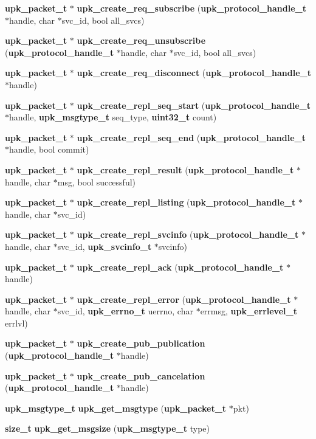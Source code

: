 \begin{DoxyCompactItemize}
{\bf upk\_\-packet\_\-t} $\ast$ {\bf upk\_\-create\_\-req\_\-subscribe} ({\bf upk\_\-protocol\_\-handle\_\-t} $\ast$handle, char $\ast$svc\_\-id, bool all\_\-svcs)
\item 
{\bf upk\_\-packet\_\-t} $\ast$ {\bf upk\_\-create\_\-req\_\-unsubscribe} ({\bf upk\_\-protocol\_\-handle\_\-t} $\ast$handle, char $\ast$svc\_\-id, bool all\_\-svcs)
\item 
{\bf upk\_\-packet\_\-t} $\ast$ {\bf upk\_\-create\_\-req\_\-disconnect} ({\bf upk\_\-protocol\_\-handle\_\-t} $\ast$handle)
\item 
{\bf upk\_\-packet\_\-t} $\ast$ {\bf upk\_\-create\_\-repl\_\-seq\_\-start} ({\bf upk\_\-protocol\_\-handle\_\-t} $\ast$handle, {\bf upk\_\-msgtype\_\-t} seq\_\-type, {\bf uint32\_\-t} count)
\item 
{\bf upk\_\-packet\_\-t} $\ast$ {\bf upk\_\-create\_\-repl\_\-seq\_\-end} ({\bf upk\_\-protocol\_\-handle\_\-t} $\ast$handle, bool commit)
\item 
{\bf upk\_\-packet\_\-t} $\ast$ {\bf upk\_\-create\_\-repl\_\-result} ({\bf upk\_\-protocol\_\-handle\_\-t} $\ast$handle, char $\ast$msg, bool successful)
\item 
{\bf upk\_\-packet\_\-t} $\ast$ {\bf upk\_\-create\_\-repl\_\-listing} ({\bf upk\_\-protocol\_\-handle\_\-t} $\ast$handle, char $\ast$svc\_\-id)
\item 
{\bf upk\_\-packet\_\-t} $\ast$ {\bf upk\_\-create\_\-repl\_\-svcinfo} ({\bf upk\_\-protocol\_\-handle\_\-t} $\ast$handle, char $\ast$svc\_\-id, {\bf upk\_\-svcinfo\_\-t} $\ast$svcinfo)
\item 
{\bf upk\_\-packet\_\-t} $\ast$ {\bf upk\_\-create\_\-repl\_\-ack} ({\bf upk\_\-protocol\_\-handle\_\-t} $\ast$handle)
\item 
{\bf upk\_\-packet\_\-t} $\ast$ {\bf upk\_\-create\_\-repl\_\-error} ({\bf upk\_\-protocol\_\-handle\_\-t} $\ast$handle, char $\ast$svc\_\-id, {\bf upk\_\-errno\_\-t} uerrno, char $\ast$errmsg, {\bf upk\_\-errlevel\_\-t} errlvl)
\item 
{\bf upk\_\-packet\_\-t} $\ast$ {\bf upk\_\-create\_\-pub\_\-publication} ({\bf upk\_\-protocol\_\-handle\_\-t} $\ast$handle)
\item 
{\bf upk\_\-packet\_\-t} $\ast$ {\bf upk\_\-create\_\-pub\_\-cancelation} ({\bf upk\_\-protocol\_\-handle\_\-t} $\ast$handle)
\item 
{\bf upk\_\-msgtype\_\-t} {\bf upk\_\-get\_\-msgtype} ({\bf upk\_\-packet\_\-t} $\ast$pkt)
\item 
{\bf size\_\-t} {\bf upk\_\-get\_\-msgsize} ({\bf upk\_\-msgtype\_\-t} type)
\end{DoxyCompactItemize}
